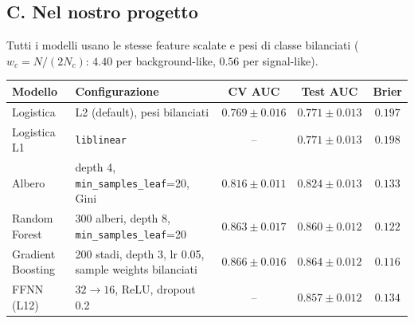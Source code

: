\documentclass[11pt,a4paper]{article}
\newcommand{\code}[1]{\texttt{#1}}
\begin{document}
\subsection*{C. Nel nostro progetto}
Tutti i modelli usano le stesse feature scalate e pesi di classe bilanciati ($w_c=N/(2N_c)$: $4.40$ per background-like, $0.56$ per signal-like).
\begin{center}
\small
\begin{tabular}{p{3.3cm}p{5.4cm}ccc}
\toprule
Modello & Configurazione & CV AUC & Test AUC & Brier \\
\midrule
Logistica & L2 (default), pesi bilanciati & $0.769\pm0.016$ & $0.771\pm0.013$ & $0.197$ \\
Logistica L1 & \code{liblinear} & -- & $0.771\pm0.013$ & $0.198$ \\
Albero & depth 4, \code{min\_samples\_leaf}=20, Gini & $0.816\pm0.011$ & $0.824\pm0.013$ & $0.133$ \\
Random Forest & 300 alberi, depth 8, \code{min\_samples\_leaf}=20 & $0.863\pm0.017$ & $0.860\pm0.012$ & $0.122$ \\
Gradient Boosting & 200 stadi, depth 3, lr 0.05, sample weights bilanciati & $\mathbf{0.866\pm0.016}$ & $0.864\pm0.012$ & $0.116$ \\
FFNN (L12) & $32\!\to\!16$, ReLU, dropout 0.2 & -- & $0.857\pm0.012$ & $0.134$ \\
\bottomrule
\end{tabular}
\end{center}
\end{document}
